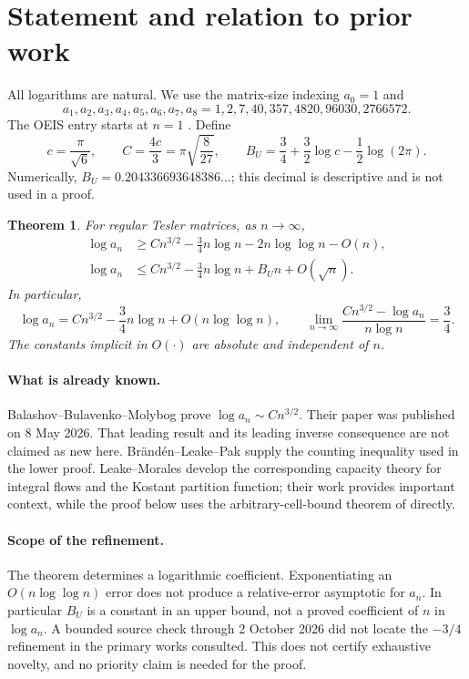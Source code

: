 \documentclass[11pt,a4paper]{article}
\newtheorem{theorem}{Theorem}[section]
\theoremstyle{remark}\newtheorem{remark}[theorem]{Remark}
\numberwithin{equation}{section}
\begin{document}
\section{Statement and relation to prior work}\label{tes:sec:main}
All logarithms are natural. We use the matrix-size indexing $a_0=1$ and
\[
a_1,a_2,a_3,a_4,a_5,a_6,a_7,a_8
=1,2,7,40,357,4820,96030,2766572.
\]
The OEIS entry starts at $n=1$ \cite{oeis}. Define
\begin{equation}\label{tes:eq:constants}
c=\frac\pi{\sqrt6},\qquad C=\frac{4c}{3}=\pi\sqrt{\frac8{27}},\qquad
B_U=\frac34+\frac32\log c-\frac12\log(2\pi).
\end{equation}
Numerically, $B_U=0.204336693648386\ldots$; this decimal is descriptive and is not used in a proof.

\begin{theorem}\label{tes:thm:main}
For regular Tesler matrices, as $n\to\infty$,
\begin{align}
\log a_n&\ge Cn^{3/2}-\frac34n\log n-2n\log\log n-O(n),\label{tes:eq:lowerintro}\\
\log a_n&\le Cn^{3/2}-\frac34n\log n+B_Un+O(\sqrt n).\label{tes:eq:upperintro}
\end{align}
In particular,
\begin{equation}\label{tes:eq:second}
\log a_n=Cn^{3/2}-\frac34n\log n+O(n\log\log n),
\qquad
\lim_{n\to\infty}\frac{Cn^{3/2}-\log a_n}{n\log n}=\frac34.
\end{equation}
The constants implicit in $O(\cdot)$ are absolute and independent of $n$.
\end{theorem}

\paragraph{What is already known.}
Balashov--Bulavenko--Molybog \cite[Corollary 37]{bbm} prove
$\log a_n\sim Cn^{3/2}$. Their paper was published on 8 May 2026. That leading result and its leading inverse consequence are not claimed as new here. Br\"and\'en--Leake--Pak \cite[Theorem 2.1]{blp} supply the counting inequality used in the lower proof. Leake--Morales \cite{lm} develop the corresponding capacity theory for integral flows and the Kostant partition function; their work provides important context, while the proof below uses the arbitrary-cell-bound theorem of \cite{blp} directly.

\paragraph{Scope of the refinement.}
The theorem determines a logarithmic coefficient. Exponentiating an $O(n\log\log n)$ error does not produce a relative-error asymptotic for $a_n$. In particular $B_U$ is a constant in an upper bound, not a proved coefficient of $n$ in $\log a_n$. A bounded source check through 2 October 2026 did not locate the $-3/4$ refinement in the primary works consulted. This does not certify exhaustive novelty, and no priority claim is needed for the proof.
\end{document}
